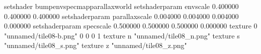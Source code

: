 setshader bumpenvspecmapparallaxworld
setshaderparam envscale 0.400000 0.400000 0.400000
setshaderparam parallaxscale 0.004000 0.004000 0.004000 0.000000
setshaderparam specscale 0.500000 0.500000 0.500000 0.000000
texture 0 "unnamed/tile08-b.png" 0 0 0 1
texture n "unnamed/tile08_n.png"
texture s "unnamed/tile08_s.png"
texture z "unnamed/tile08_z.png"